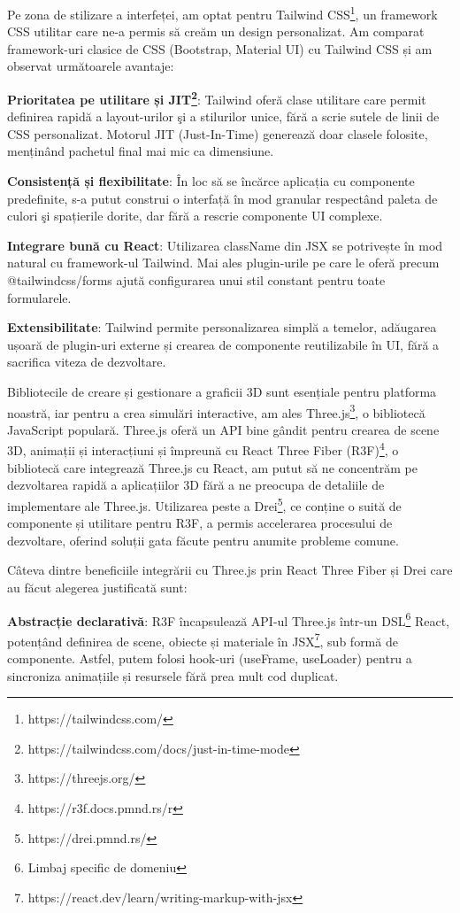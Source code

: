 Pe zona de stilizare a interfeței, am optat pentru Tailwind CSS\footnote{https://tailwindcss.com/}, un framework CSS utilitar 
care ne-a permis să creăm un design personalizat. Am comparat framework-uri clasice de CSS
(Bootstrap, Material UI) cu Tailwind CSS și am observat următoarele avantaje:

\textbf{Prioritatea pe utilitare și JIT\footnote{https://tailwindcss.com/docs/just-in-time-mode}}:
  Tailwind oferă clase utilitare care permit definirea rapidă a
  layout-urilor şi a stilurilor unice, fără a scrie sutele de linii de CSS personalizat. Motorul
  JIT (Just-In-Time) generează doar clasele folosite, menținând pachetul final mai mic ca dimensiune.

\textbf{Consistență și flexibilitate}:
  În loc să se încărce aplicația cu componente predefinite,
  s-a putut construi o interfață în mod granular respectând paleta de culori şi spațierile dorite,
  dar fără a rescrie componente UI complexe.

\textbf{Integrare bună cu React}:
  Utilizarea className din JSX se potrivește în mod natural cu framework-ul Tailwind.
  Mai ales plugin-urile pe care le oferă precum @tailwindcss/forms ajută configurarea unui stil constant pentru
  toate formularele.

\textbf{Extensibilitate}:
  Tailwind permite personalizarea simplă a temelor, adăugarea ușoară de plugin-uri externe și crearea de 
  componente reutilizabile în UI, fără a sacrifica viteza de dezvoltare.

Bibliotecile de creare și gestionare a graficii 3D sunt esențiale pentru platforma noastră,
iar pentru a crea simulări interactive, am ales Three.js\footnote{https://threejs.org/}, o bibliotecă JavaScript populară.
Three.js oferă un API bine gândit pentru crearea de scene 3D, animații și interacțiuni și împreună
cu React Three Fiber (R3F)\footnote{https://r3f.docs.pmnd.rs/r}, o bibliotecă care integrează Three.js cu React, am putut să ne concentrăm
pe dezvoltarea rapidă a aplicațiilor 3D fără a ne preocupa de detaliile de implementare ale Three.js.
Utilizarea peste a Drei\footnote{https://drei.pmnd.rs/}, ce conține o suită de componente și utilitare pentru R3F, a permis accelerarea
procesului de dezvoltare, oferind soluții gata făcute pentru anumite probleme comune.

Câteva dintre beneficiile integrării cu Three.js prin React Three Fiber și Drei care au făcut 
alegerea justificată sunt:

\textbf{Abstracție declarativă}:
  R3F încapsulează API-ul Three.js într-un
  DSL\footnote{Limbaj specific de domeniu} React, 
  potențând definirea de scene, obiecte și materiale în JSX\footnote{https://react.dev/learn/writing-markup-with-jsx}, 
  sub formă de componente. 
  Astfel, putem folosi hook-uri (useFrame, useLoader) pentru a sincroniza animațiile și 
  resursele fără prea mult cod duplicat.

